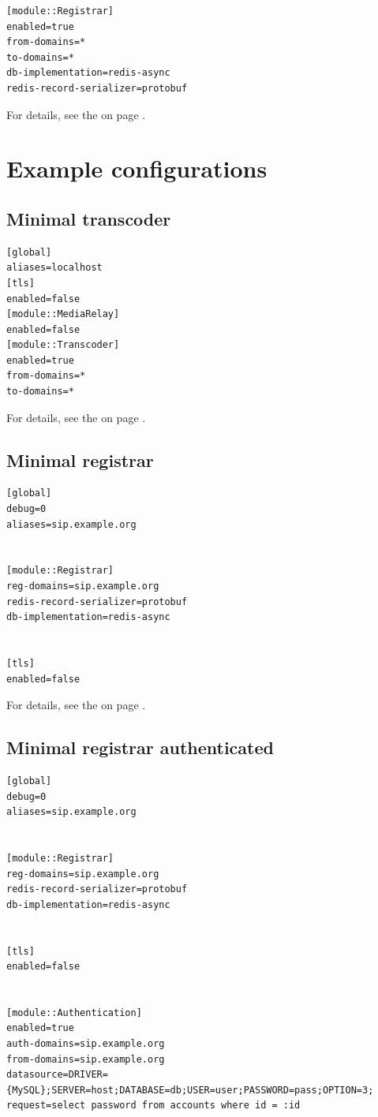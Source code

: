 \documentclass[a4paper,10pt]{article}
\begin{document}
\begin{verbatim}
[module::Registrar]
enabled=true
from-domains=*
to-domains=*
db-implementation=redis-async
redis-record-serializer=protobuf
\end{verbatim}

For details, see the  on page \pageref{module::Registrar}.


\section{Example configurations}
\subsection{Minimal transcoder}
\begin{verbatim}
[global]
aliases=localhost
[tls]
enabled=false
[module::MediaRelay]
enabled=false
[module::Transcoder]
enabled=true
from-domains=*
to-domains=*
\end{verbatim}

For details, see the  on page \pageref{module::Transcoder}.


\subsection{Minimal registrar}
\begin{verbatim}
[global]
debug=0
aliases=sip.example.org


[module::Registrar]
reg-domains=sip.example.org
redis-record-serializer=protobuf
db-implementation=redis-async


[tls]
enabled=false
\end{verbatim}

For details, see the  on page \pageref{module::Registrar}.



\subsection{Minimal registrar authenticated}
\begin{verbatim}
[global]
debug=0
aliases=sip.example.org


[module::Registrar]
reg-domains=sip.example.org
redis-record-serializer=protobuf
db-implementation=redis-async


[tls]
enabled=false


[module::Authentication]
enabled=true
auth-domains=sip.example.org
from-domains=sip.example.org
datasource=DRIVER={MySQL};SERVER=host;DATABASE=db;USER=user;PASSWORD=pass;OPTION=3;
request=select password from accounts where id = :id
\end{verbatim}
\end{document}
